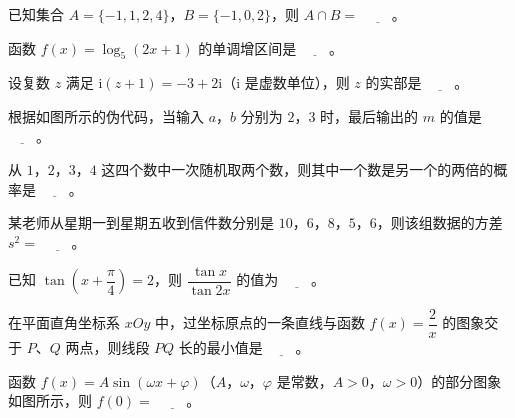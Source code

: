 

\begin{question}
已知集合 $A=\{-1,1,2,4\}$，$B=\{-1,0,2\}$，则 $A\cap B=$ $\underline{\qquad}$。

\end{question}
\begin{question}
函数 $f(x)=\log_5(2x+1)$ 的单调增区间是 $\underline{\qquad}$。

\end{question}
\begin{question}
设复数 $z$ 满足 $\mathrm i(z+1)=-3+2\mathrm i$（$\mathrm i$ 是虚数单位），则 $z$ 的实部是 $\underline{\qquad}$。

\Needspace{0.4\textheight}
\end{question}
\begin{question}
根据如图所示的伪代码，当输入 $a$，$b$ 分别为 $2$，$3$ 时，最后输出的 $m$ 的值是 $\underline{\qquad}$。
\nopagebreak[4]
\begin{center}\end{center}
\nopagebreak[4]
\end{question}
\begin{question}
从 $1$，$2$，$3$，$4$ 这四个数中一次随机取两个数，则其中一个数是另一个的两倍的概率是 $\underline{\qquad}$。

\end{question}
\begin{question}
某老师从星期一到星期五收到信件数分别是 $10$，$6$，$8$，$5$，$6$，则该组数据的方差 $s^2=$ $\underline{\qquad}$。

\end{question}
\begin{question}
已知 $\tan\left(x+\dfrac\pi4\right)=2$，则 $\dfrac{\tan x}{\tan2x}$ 的值为 $\underline{\qquad}$。

\end{question}
\begin{question}
在平面直角坐标系 $xOy$ 中，过坐标原点的一条直线与函数 $f(x)=\dfrac2x$ 的图象交于 $P$、$Q$ 两点，则线段 $PQ$ 长的最小值是 $\underline{\qquad}$。

\Needspace{0.4\textheight}
\end{question}
\begin{question}
函数 $f(x)=A\sin(\omega x+\varphi)$（$A$，$\omega$，$\varphi$ 是常数，$A>0$，$\omega>0$）的部分图象如图所示，则 $f(0)=$ $\underline{\qquad}$。
\nopagebreak[4]
\begin{center}\end{center}
\nopagebreak[4]
\end{question}
